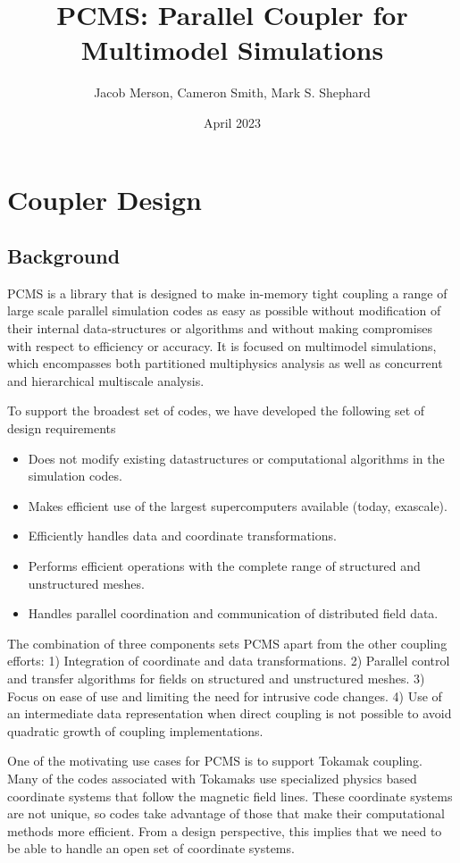 \documentclass[12pt]{article}
\title{PCMS: Parallel Coupler for Multimodel Simulations}
\author{Jacob Merson, Cameron Smith, Mark S. Shephard}
\date{April 2023}
\begin{document}
\maketitle
\section{Coupler Design}
\subsection{Background}
PCMS is a library that is designed to make in-memory tight coupling a range of large scale parallel simulation codes as easy as possible without modification of their internal data-structures or algorithms and without making compromises with respect to efficiency or accuracy. It is focused on multimodel simulations, which encompasses both partitioned multiphysics analysis as well as concurrent and hierarchical multiscale analysis.

To support the broadest set of codes, we have developed the following set of design requirements 
\begin{itemize}
    \item Does not modify existing datastructures or computational algorithms in the simulation codes.
    \item Makes efficient use of the largest supercomputers available (today, exascale).
    \item Efficiently handles data and coordinate transformations.
    \item Performs efficient operations with the complete range of structured and unstructured meshes.
    \item Handles parallel coordination and communication of distributed field data.
\end{itemize}

The combination of three components sets PCMS apart from the other coupling efforts: 1) Integration of coordinate and data transformations. 2) Parallel control and transfer algorithms for fields on structured and unstructured meshes. 3) Focus on ease of use and limiting the need for intrusive code changes. 4) Use of an intermediate data representation when direct coupling is not possible to avoid quadratic growth of coupling implementations.

One of the motivating use cases for PCMS is to support Tokamak coupling. Many of the codes associated with Tokamaks use specialized physics based coordinate systems that follow the magnetic field lines. These coordinate systems are not unique, so codes take advantage of those that make their computational methods more efficient. From a design perspective, this implies that we need to be able to handle an open set of coordinate systems.
\end{document}
